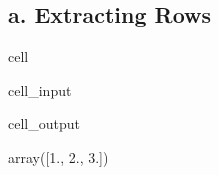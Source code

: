 \documentclass[letterpaper,10pt,english]{jupyterBook}
\begin{document}
\subsection{a. Extracting Rows}
\label{\detokenize{lessons/Intro_to_Matrices_in_NumPy:a-extracting-rows}}
\begin{sphinxuseclass}{cell}\begin{sphinxVerbatimInput}

\begin{sphinxuseclass}{cell_input}
\begin{sphinxVerbatim}[commandchars=\\\{\}]
  \PYG{p}{[} \PYG{p}{]}
\end{sphinxVerbatim}

\end{sphinxuseclass}\end{sphinxVerbatimInput}
\begin{sphinxVerbatimOutput}

\begin{sphinxuseclass}{cell_output}
\begin{sphinxVerbatim}[commandchars=\\\{\}]
array([1., 2., 3.])
\end{sphinxVerbatim}

\end{sphinxuseclass}\end{sphinxVerbatimOutput}

\end{sphinxuseclass}
\end{document}
